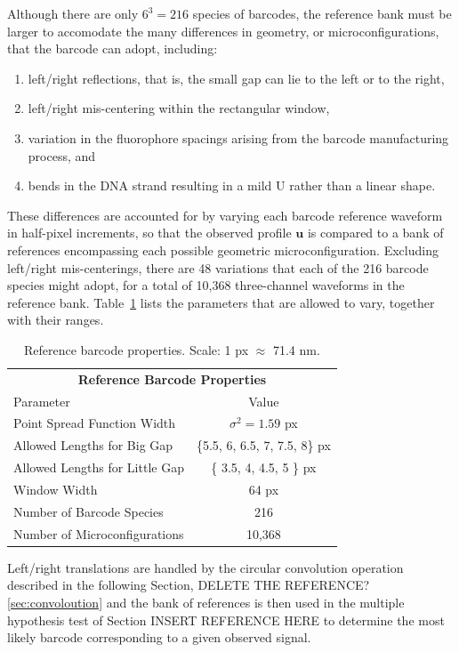 Although there are only $6^3=216$ species of barcodes, the reference bank must be larger to accomodate the many differences in geometry, or microconfigurations, that the barcode can adopt, including:
\begin{enumerate}
\item left/right reflections, that is, the small gap can lie to the left or to the right,
\item left/right mis-centering within the rectangular window,
\item variation in the fluorophore spacings arising from the barcode manufacturing process, and
\item bends in the DNA strand resulting in a mild U rather than a linear shape.
\end{enumerate}
These differences are accounted for by varying each barcode reference waveform in half-pixel increments, so that the observed profile $\mathbf{u}$ is compared to a bank of references encompassing each possible geometric microconfiguration. Excluding left/right mis-centerings, there are 48 variations that each of the 216 barcode species might adopt, for a total of 10,368 three-channel waveforms in the reference bank. Table~\ref{table:reference} lists the parameters that are allowed to vary, together with their ranges. 

\begin{table}[htbp] 	
\begin{center}
\begin{tabular}{l c}
\multicolumn{2}{c}{\textbf{Reference Barcode Properties}}\\
Parameter & Value \\
\hline
Point Spread Function Width  & $\sigma^2=1.59$ px \\
Allowed Lengths for Big Gap &  \{5.5, 6, 6.5, 7, 7.5, 8\} px \\
Allowed Lengths for Little Gap  & \{ 3.5, 4, 4.5, 5 \} px\\
Window Width & 64 px\\
Number of Barcode Species & 216 \\
Number of Microconfigurations & 10,368 \\
\hline
\end{tabular}
\caption{Reference barcode properties. Scale: 1 px $\approx$ 71.4 nm.\label{table:reference}}
\end{center}
\end{table}

Left/right translations are handled by the circular convolution operation described in the following Section, DELETE THE REFERENCE? \ref{sec:convoloution}  and the bank of references is then used in the multiple hypothesis test of Section INSERT REFERENCE HERE to determine the most likely barcode corresponding to a given observed signal.


